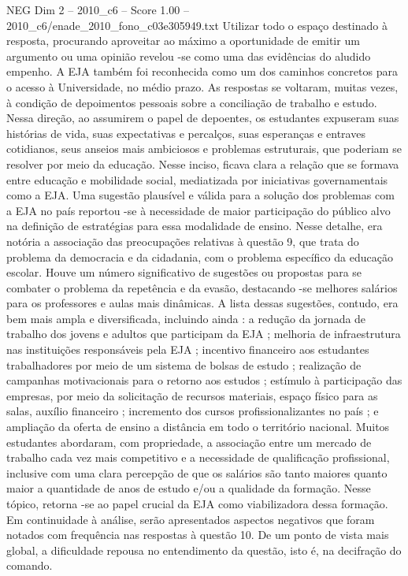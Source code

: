 \begin{textsample}{NEG Dim 2 – 2010\_c6 – Score 1.00 – 2010\_c6/enade\_2010\_fono\_c03e305949.txt}
Utilizar todo o espaço destinado à resposta, procurando aproveitar ao máximo a oportunidade de emitir um argumento ou uma opinião revelou -se como uma das evidências do aludido empenho.
A EJA também foi reconhecida como um dos caminhos concretos para o acesso à Universidade, no médio prazo.
As respostas se voltaram, muitas vezes, à condição de depoimentos pessoais sobre a conciliação de trabalho e estudo.
Nessa direção, ao assumirem o papel de depoentes, os estudantes expuseram suas histórias de vida, suas expectativas e percalços, suas esperanças e entraves cotidianos, seus anseios mais ambiciosos e problemas estruturais, que poderiam se resolver por meio da educação.
Nesse inciso, ficava clara a relação que se formava entre educação e mobilidade social, mediatizada por iniciativas governamentais como a EJA.
Uma sugestão plausível e válida para a solução dos problemas com a EJA no país reportou -se à necessidade de maior participação do público alvo na definição de estratégias para essa modalidade de ensino.
Nesse detalhe, era notória a associação das preocupações relativas à questão 9, que trata do problema da democracia e da cidadania, com o problema específico da educação escolar.
Houve um número significativo de sugestões ou propostas para se combater o problema da repetência e da evasão, destacando -se melhores salários para os professores e aulas mais dinâmicas.
A lista dessas sugestões, contudo, era bem mais ampla e diversificada, incluindo ainda : a redução da jornada de trabalho dos jovens e adultos que participam da EJA ; melhoria de infraestrutura nas instituições responsáveis pela EJA ; incentivo financeiro aos estudantes trabalhadores por meio de um sistema de bolsas de estudo ; realização de campanhas motivacionais para o retorno aos estudos ; estímulo à participação das empresas, por meio da solicitação de recursos materiais, espaço físico para as salas, auxílio financeiro ; incremento dos cursos profissionalizantes no país ; e ampliação da oferta de ensino a distância em todo o território nacional.
Muitos estudantes abordaram, com propriedade, a associação entre um mercado de trabalho cada vez mais competitivo e a necessidade de qualificação profissional, inclusive com uma clara percepção de que os salários são tanto maiores quanto maior a quantidade de anos de estudo e/ou a qualidade da formação.
Nesse tópico, retorna -se ao papel crucial da EJA como viabilizadora dessa formação.
Em continuidade à análise, serão apresentados aspectos negativos que foram notados com frequência nas respostas à questão 10.
De um ponto de vista mais global, a dificuldade repousa no entendimento da questão, isto é, na decifração do comando.

\end{textsample}
